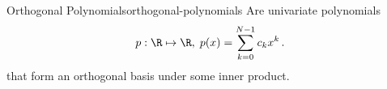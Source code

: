 \begin{definition}{Orthogonal Polynomials}{orthogonal-polynomials}
  Are univariate polynomials
  $$p: \R \mapsto \R, \; p(x) = \sum_{k=0}^{N-1} c_k x^k\,.$$
  that form an orthogonal basis under some inner product.
\end{definition}

